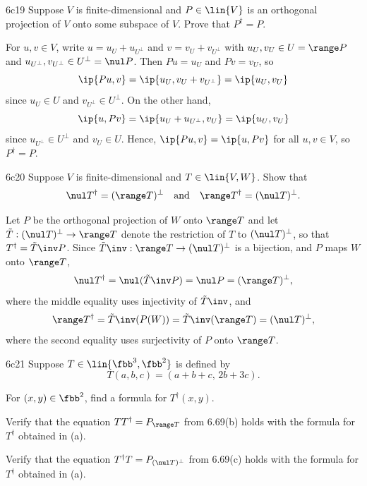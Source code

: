 \begin{exercise}{6c19}
    Suppose $V$ is finite-dimensional and $P \in \lin{V}$ is an orthogonal projection of $V$ onto some subspace of $V$.
    Prove that $P^\dagger = P$.
\end{exercise}

\begin{sol}
    For $u, v \in V$, write $u = u_U + u_{U^\perp}$ and $v = v_U + v_{U^\perp}$ with $u_U, v_U \in U = \range P$ and $u_{U^\perp}, v_{U^\perp} \in U^\perp = \nul P$.
    Then $Pu = u_U$ and $Pv = v_U$, so
    \[
        \ip{Pu, v} = \ip{u_U, v_U + v_{U^\perp}} = \ip{u_U, v_U}
    \]
    since $u_U \in U$ and $v_{U^\perp} \in U^\perp$.
    On the other hand,
    \[
        \ip{u, Pv} = \ip{u_U + u_{U^\perp}, v_U} = \ip{u_U, v_U}
    \]
    since $u_{U^\perp} \in U^\perp$ and $v_U \in U$.
    Hence, $\ip{Pu, v} = \ip{u, Pv}$ for all $u, v \in V$, so $P^\dagger = P$.
\end{sol}

\begin{exercise}{6c20}
    Suppose $V$ is finite-dimensional and $T \in \lin{V, W}$.
    Show that
    \[
        \nul T^\dagger = (\range T)^\perp \quad \text{and} \quad \range T^\dagger = (\nul T)^\perp.
    \]
\end{exercise}

\begin{sol}
    Let $P$ be the orthogonal projection of $W$ onto $\range T$ and let $\tilde{T} : (\nul T)^\perp \to \range T$ denote the restriction of $T$ to $(\nul T)^\perp$, so that $T^\dagger = \tilde{T}\inv P$. Since $\tilde{T}\inv : \range T \to (\nul T)^\perp$ is a bijection, and $P$ maps $W$ onto $\range T$,
    \[
        \nul T^\dagger = \nul(\tilde{T}\inv P) = \nul P = (\range T)^\perp,
    \]
    where the middle equality uses injectivity of $\tilde{T}\inv$, and
    \[
        \range T^\dagger = \tilde{T}\inv(P(W)) = \tilde{T}\inv(\range T) = (\nul T)^\perp,
    \]
    where the second equality uses surjectivity of $P$ onto $\range T$.
\end{sol}

\begin{exercise}{6c21}
    Suppose $T \in \lin{\fbb^3, \fbb^2}$ is defined by
    \[
        T(a, b, c) = (a + b + c,\, 2b + 3c).
    \]
    \begin{subexercises}
        \item For $(x, y) \in \fbb^2$, find a formula for $T^\dagger(x, y)$.
        \item Verify that the equation $TT^\dagger = P_{\range T}$ from 6.69(b) holds with the formula for $T^\dagger$ obtained in (a).
        \item Verify that the equation $T^\dagger T = P_{(\nul T)^\perp}$ from 6.69(c) holds with the formula for $T^\dagger$ obtained in (a).
    \end{subexercises}
\end{exercise}

